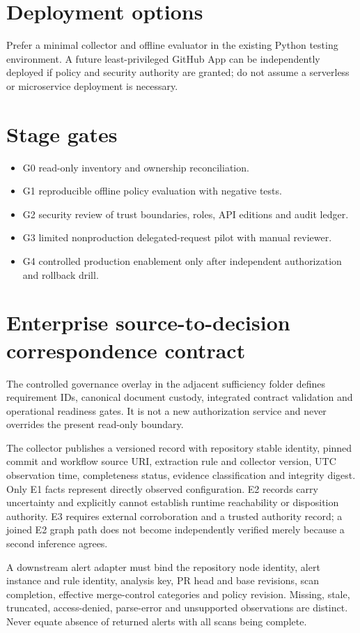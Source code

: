 \documentclass[11pt,letterpaper]{article}
\begin{document}
\section{Deployment options}
Prefer a minimal collector and offline evaluator in the existing Python testing environment. A future least-privileged GitHub App can be independently deployed if policy and security authority are granted; do not assume a serverless or microservice deployment is necessary.


\section{Stage gates}
\begin{itemize}
\item G0 read-only inventory and ownership reconciliation.
\item G1 reproducible offline policy evaluation with negative tests.
\item G2 security review of trust boundaries, roles, API editions and audit ledger.
\item G3 limited nonproduction delegated-request pilot with manual reviewer.
\item G4 controlled production enablement only after independent authorization and rollback drill.
\end{itemize}

\section{Enterprise source-to-decision correspondence contract}
The controlled governance overlay in the adjacent sufficiency folder defines requirement IDs, canonical document custody, integrated contract validation and operational readiness gates. It is not a new authorization service and never overrides the present read-only boundary.

The collector publishes a versioned record with repository stable identity, pinned commit and workflow source URI, extraction rule and collector version, UTC observation time, completeness status, evidence classification and integrity digest. Only E1 facts represent directly observed configuration. E2 records carry uncertainty and explicitly cannot establish runtime reachability or disposition authority. E3 requires external corroboration and a trusted authority record; a joined E2 graph path does not become independently verified merely because a second inference agrees.

A downstream alert adapter must bind the repository node identity, alert instance and rule identity, analysis key, PR head and base revisions, scan completion, effective merge-control categories and policy revision. Missing, stale, truncated, access-denied, parse-error and unsupported observations are distinct. Never equate absence of returned alerts with all scans being complete.
\end{document}
